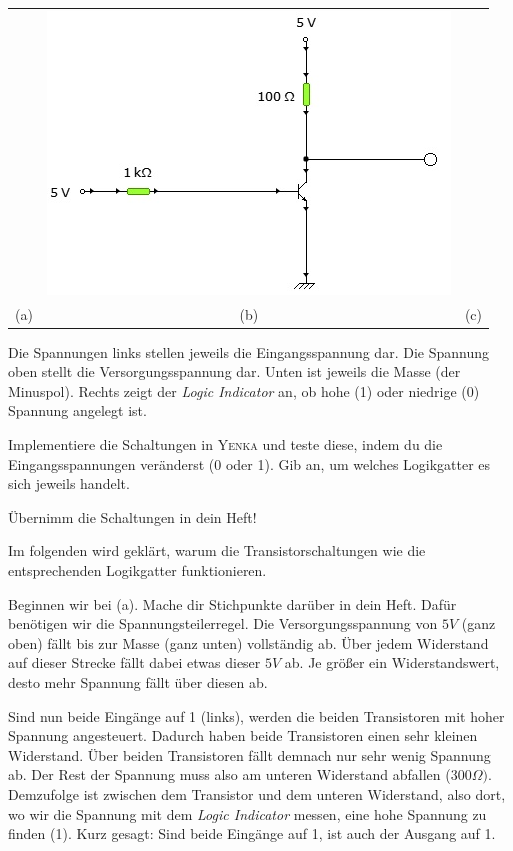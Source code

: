 \begin{Aufgabe}
\begin{center}
\begin{tabular}{ccc}
&
\includegraphics[scale=.4]{pics/NOTTrans}
\\
(a) & (b) & (c)
\end{tabular}
\end{center}

Die Spannungen links stellen jeweils die Eingangsspannung dar. Die Spannung oben stellt die Versorgungsspannung dar. Unten ist jeweils die Masse (der Minuspol). Rechts zeigt der \emph{Logic Indicator} an, ob hohe (1) oder niedrige (0) Spannung angelegt ist.


Implementiere die Schaltungen in \textsc{Yenka} und teste diese, indem du die Eingangsspannungen veränderst (0 oder 1). Gib an, um welches Logikgatter es sich jeweils handelt.

Übernimm die Schaltungen in dein Heft!
\end{Aufgabe}

Im folgenden wird geklärt, warum die Transistorschaltungen wie die entsprechenden Logikgatter funktionieren.

Beginnen wir bei (a). Mache dir Stichpunkte darüber in dein Heft.
Dafür benötigen wir die Spannungsteilerregel. 
Die Versorgungsspannung von $5V$ (ganz oben) fällt bis zur Masse (ganz unten) vollständig ab.
Über jedem Widerstand auf dieser Strecke fällt dabei etwas dieser $5V$ ab.
Je größer ein Widerstandswert, desto mehr Spannung fällt über diesen ab.

Sind nun beide Eingänge auf 1 (links), werden die beiden Transistoren mit hoher Spannung angesteuert.
Dadurch haben beide Transistoren einen sehr kleinen Widerstand.
Über beiden Transistoren fällt demnach nur sehr wenig Spannung ab.
Der Rest der Spannung muss also am unteren Widerstand abfallen ($300 \Omega)$.
Demzufolge ist zwischen dem Transistor und dem unteren Widerstand, also dort, wo wir die Spannung mit dem \emph{Logic Indicator} messen, eine hohe Spannung zu finden (1).
Kurz gesagt: Sind beide Eingänge auf 1, ist auch der Ausgang auf 1.

